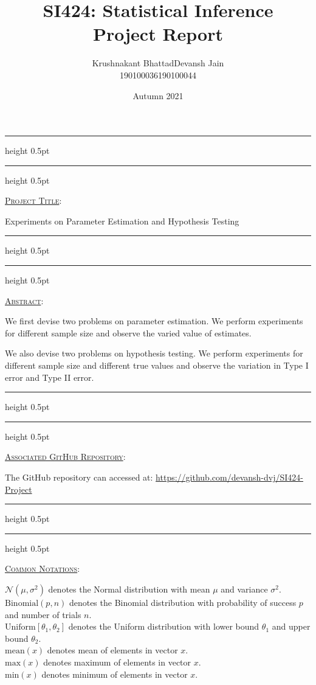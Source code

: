 \documentclass[fleqn, 11pt]{article}
\title{SI424: Statistical Inference \\ Project Report}
\author{
    \begin{tabular}{|c|c|}
        \hline
        \textsf{Krushnakant Bhattad} & \textsf{ \hspace{5pt} Devansh Jain \hspace{5pt} } \\
        \hline
        \textsf{190100036} & \textsf{190100044}\\
        \hline
    \end{tabular}
}
\date{Autumn 2021}
\newcommand{\myline}{
    \par
    \kern3pt %
    \hrule height 0.5pt
    \kern2pt %
    \hrule height 0.5pt
    \kern3pt %
    \par
}
\renewcommand{\arraystretch}{2}%
\begin{document}
\maketitle
\thispagestyle{empty}
\renewcommand{\arraystretch}{1}%
\setcounter{page}{0}

\myline
\vspace{10pt}
\underline{\large {\textsc{Project Title}}}:

\medskip

Experiments on Parameter Estimation and Hypothesis Testing

\vspace{7pt}
\myline
\vspace{10pt}
\underline{\large {\textsc{Abstract}}}:

\medskip

We first devise two problems on parameter estimation. We perform experiments for different sample size and observe the varied value of estimates.

We also devise two problems on hypothesis testing. We perform experiments for different sample size and different true values and observe the variation in Type I error and Type II error.

\vspace{7pt}
\myline
\vspace{10pt}
\underline{\large {\textsc{Associated GitHub Repository}}}:

\medskip

The GitHub repository can accessed at: \url{https://github.com/devansh-dvj/SI424-Project}

\vspace{7pt}
\myline
\vspace{10pt}
\underline{\large {\textsc{Common Notations}}}:

\medskip

$\mathcal{N}(\mu, \sigma^2)$ denotes the Normal distribution with mean $\mu$ and variance $\sigma^2$. \\
$\mathrm{Binomial}(p, n)$ denotes the Binomial distribution with probability of success $p$ and number of trials $n$. \\
$\mathrm{Uniform}[\theta_1, \theta_2]$ denotes the Uniform distribution with lower bound $\theta_1$ and upper bound $\theta_2$. \\
$\mathrm{mean}(x)$ denotes mean of elements in vector $x$. \\
$\mathrm{max}(x)$ denotes maximum of elements in vector $x$. \\
$\mathrm{min}(x)$ denotes minimum of elements in vector $x$.
\end{document}

